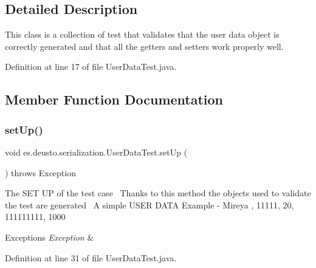\subsection{Detailed Description}
This class is a collection of test that validates that the user data object is correctly generated and that all the getters and setters work properly well. 

Definition at line 17 of file User\+Data\+Test.\+java.



\subsection{Member Function Documentation}
\mbox{\label{classes_1_1deusto_1_1serialization_1_1_user_data_test_a516d13b55d42b812fec8228334afbcaf}} 
\subsubsection{\texorpdfstring{set\+Up()}{setUp()}}
{\footnotesize\ttfamily void es.\+deusto.\+serialization.\+User\+Data\+Test.\+set\+Up (\begin{DoxyParamCaption}{ }\end{DoxyParamCaption}) throws Exception}

The S\+ET UP of the test case~\newline
Thanks to this method the objects used to validate the test are generated~\newline
A simple U\+S\+ER D\+A\+TA Example -\/ Mireya , 11111, 20, 111111111, 1000


\begin{DoxyExceptions}{Exceptions}
{\em Exception} & \\
\hline
\end{DoxyExceptions}


Definition at line 31 of file User\+Data\+Test.\+java.

\mbox{\label{classes_1_1deusto_1_1serialization_1_1_user_data_test_a28ec7d8b20979ac4728275517ffb44f2}} 
